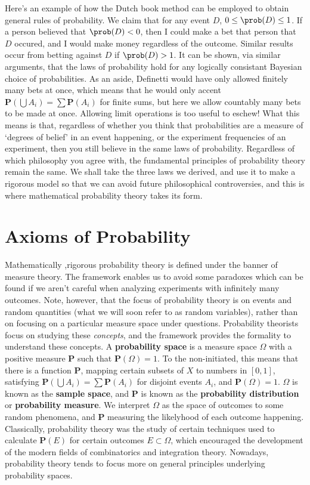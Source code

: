 Here's an example of how the Dutch book method can be employed to obtain general rules of probability. We claim that for any event $D$, $0 \leq \prob(D) \leq 1$. If a person believed that $\prob(D) < 0$, then I could make a bet that person that $D$ occured, and I would make money regardless of the outcome. Similar results occur from betting against $D$ if $\prob(D) > 1$. It can be shown, via similar arguments, that the laws of probability hold for any logically consistant Bayesian choice of probabilities. As an aside, Definetti would have only allowed finitely many bets at once, which means that he would only accent $\mathbf{P}(\bigcup A_i) = \sum \mathbf{P}(A_i)$ for finite sums, but here we allow countably many bets to be made at once. Allowing limit operations is too useful to eschew! What this means is that, regardless of whether you think that probabilities are a measure of `degrees of belief' in an event happening, or the experiment frequencies of an experiment, then you still believe in the same laws of probability. Regardless of which philosophy you agree with, the fundamental principles of probability theory remain the same. We shall take the three laws we derived, and use it to make a rigorous model so that we can avoid future philosophical controversies, and this is where mathematical probability theory takes its form.

\section{Axioms of Probability}

Mathematically ,rigorous probability theory is defined under the banner of measure theory. The framework enables us to avoid some paradoxes which can be found if we aren't careful when analyzing experiments with infinitely many outcomes. Note, however, that the focus of probability theory is on events and random quantities (what we will soon refer to as random variables), rather than on focusing on a particular measure space under questions. Probability theorists focus on studying these {\it concepts}, and the framework provides the formality to understand these concepts. A {\bf probability space} is a measure space $\Omega$ with a positive measure $\mathbf{P}$ such that $\mathbf{P}(\Omega) = 1$. To the non-initiated, this means that there is a function $\mathbf{P}$, mapping certain subsets of $X$ to numbers in $[0,1]$, satisfying $\mathbf{P}(\bigcup A_i) = \sum \mathbf{P}(A_i)$ for disjoint events $A_i$, and $\mathbf{P}(\Omega) = 1$. $\Omega$ is known as the {\bf sample space}, and $\mathbf{P}$ is known as the {\bf probability distribution} or {\bf probability measure}. We interpret $\Omega$ as the space of outcomes to some random phenomena, and $\mathbf{P}$ measuring the likelyhood of each outcome happening. Classically, probability theory was the study of certain techniques used to calculate $\mathbf{P}(E)$ for certain outcomes $E \subset \Omega$, which encouraged the development of the modern fields of combinatorics and integration theory. Nowadays, probability theory tends to focus more on general principles underlying probability spaces.

